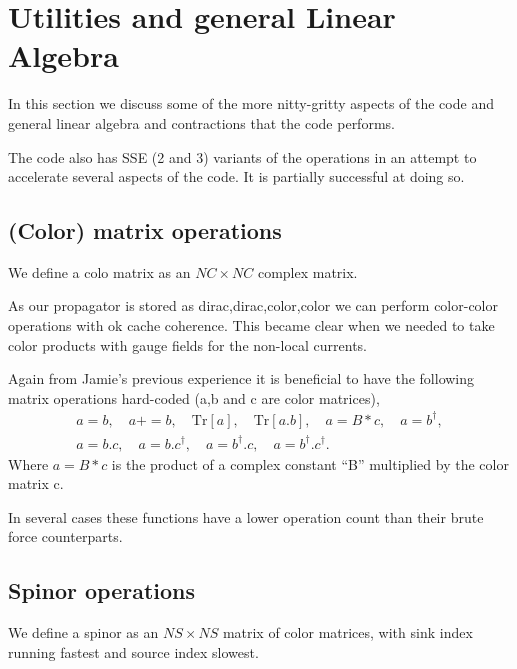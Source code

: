 \section{Utilities and general Linear Algebra}

In this section we discuss some of the more nitty-gritty aspects
of the code and general linear algebra and contractions that the
code performs.

The code also has SSE (2 and 3) variants of the operations in an
attempt to accelerate several aspects of the code. It is partially
successful at doing so.

\subsection{(Color) matrix operations}

We define a colo matrix as an $NC\times NC$ complex matrix.

As our propagator is stored as dirac,dirac,color,color we can
perform color-color operations with ok cache coherence. This
became clear when we needed to take color products with gauge
fields for the non-local currents.

Again from Jamie's previous experience it is beneficial to
have the following matrix operations hard-coded (a,b and c
are color matrices),
\begin{equation}
\begin{gathered}
a=b, \quad a+=b, \quad \text{Tr}\left[ a \right], \quad \text{Tr}\left[ a.b \right], 
\quad a=B*c, \quad a=b^{\dagger}, \\
a=b.c, \quad a=b.c^{\dagger}, \quad a=b^{\dagger}.c, \quad a=b^{\dagger}.c^{\dagger}.
\end{gathered}
\end{equation}
Where $a=B*c$ is the product of a complex constant ``B'' multiplied
by the color matrix c.

In several cases these functions have a lower operation count than
their brute force counterparts.

\subsection{Spinor operations}

We define a spinor as an $NS \times NS$ matrix of color matrices,
with sink index running fastest and source index slowest.

